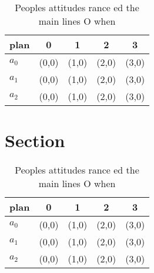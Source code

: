 \documentclass[a4paper]{article}
\begin{document}
\begin{table}
\begin{adjustbox}{width=0.6\columnwidth}
\begin{tabular}{|l|l|l|l|l|}
\hline
\textbf{plan} & \multicolumn{1}{c|}{\textbf{0}} & \multicolumn{1}{c|}{\textbf{1}} & \multicolumn{1}{c|}{\textbf{2}} & \multicolumn{1}{c|}{\textbf{3}} \\ \hline
\textbf{$a_0$}  & (0,0) & (1,0) & (2,0) & (3,0) \\ \hline
\textbf{$a_1$}  & (0,0) & (1,0) & (2,0) & (3,0) \\ \hline
\textbf{$a_2$}  & (0,0) & (1,0) & (2,0) & (3,0) \\ \hline
\end{tabular}
\end{adjustbox}
\caption{Peoples attitudes rance ed the main lines O when 
}
\end{table}

\section{Section}

\begin{table}
\begin{adjustbox}{width=0.6\columnwidth}
\begin{tabular}{|l|l|l|l|l|}
\hline
\textbf{plan} & \multicolumn{1}{c|}{\textbf{0}} & \multicolumn{1}{c|}{\textbf{1}} & \multicolumn{1}{c|}{\textbf{2}} & \multicolumn{1}{c|}{\textbf{3}} \\ \hline
\textbf{$a_0$}  & (0,0) & (1,0) & (2,0) & (3,0) \\ \hline
\textbf{$a_1$}  & (0,0) & (1,0) & (2,0) & (3,0) \\ \hline
\textbf{$a_2$}  & (0,0) & (1,0) & (2,0) & (3,0) \\ \hline
\end{tabular}
\end{adjustbox}
\caption{Peoples attitudes rance ed the main lines O when 
}
\end{table}
\end{document}
